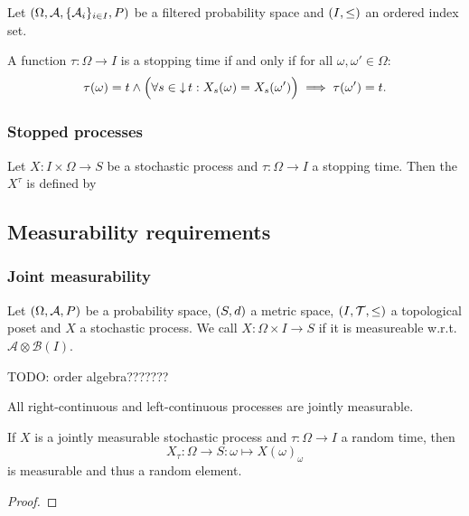 \begin{theorem}
Let $\sSet{\Omega, \mathcal{A}, \{\mathcal{A}_i\}_{i\in I}, P}$ be a filtered probability space and $\sSet{I,\leq}$ an ordered index set.

A function $\tau: \Omega\to I$ is a stopping time \textup{if and only if} for all $\omega,\omega'\in \Omega$:
\[ \tau(\omega) = t \land \Big( \forall s\in\operatorname{\downarrow} t: X_s(\omega) = X_s(\omega') \Big) \implies \tau(\omega')=t. \]
\end{theorem}

\subsubsection{Stopped processes}
\begin{definition}
Let $X: I\times \Omega\to S$ be a stochastic process and $\tau:\Omega\to I$ a stopping time. Then the  $X^\tau$ is defined by
\end{definition}

\subsection{Measurability requirements}
\subsubsection{Joint measurability}
\begin{definition}
Let $\sSet{\Omega, \mathcal{A}, P}$ be a probability space, $\sSet{S,d}$ a metric space, $\sSet{I,\mathcal{T}, \leq}$ a topological poset and $X$ a stochastic process. We call $X: \Omega\times I\to S$  if it is measureable w.r.t. $\mathcal{A}\otimes \mathcal{B}(I)$.
\end{definition}

TODO: order algebra???????

\begin{lemma}
All right-continuous and left-continuous processes are jointly measurable. 
\end{lemma}

\begin{proposition}
If $X$ is a jointly measurable stochastic process and $\tau: \Omega\to I$ a random time, then
\[ X_\tau: \Omega\to S: \omega\mapsto X(\omega)_{\omega} \]
is measurable and thus a random element.
\end{proposition}
\begin{proof}

\end{proof}

